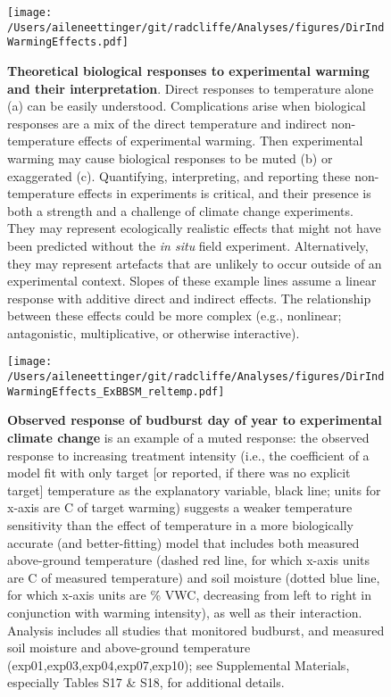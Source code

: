 \documentclass{article}
\begin{document}
 \begin{figure}[h]
\centering
 \texttt{[image: /Users/aileneettinger/git/radcliffe/Analyses/figures/DirIndWarmingEffects.pdf]} 
 \caption{\textbf{Theoretical biological responses to experimental warming and their interpretation}. Direct responses to temperature alone (a) can be easily understood. Complications arise when biological responses are a mix of the direct temperature and indirect non-temperature effects of experimental warming. Then experimental warming may cause biological responses to be muted (b) or exaggerated (c). Quantifying, interpreting, and reporting these non-temperature effects in experiments is critical, and their presence is both a strength and a challenge of climate change experiments. They may represent ecologically realistic effects that might not have been predicted without the \emph{in situ} field experiment. Alternatively, they may represent artefacts that are unlikely to occur outside of an experimental context. Slopes of these example lines assume a linear response with additive direct and indirect effects. The relationship between these effects could be more complex (e.g., nonlinear; antagonistic, multiplicative, or otherwise interactive).} 
\label{fig:biolimp}
\end{figure}

\begin{figure}[h]
\centering
 \texttt{[image: /Users/aileneettinger/git/radcliffe/Analyses/figures/DirIndWarmingEffects\_ExBBSM\_reltemp.pdf]} 
 \caption{\textbf{Observed response of budburst day of year to experimental climate change} is an example of a muted response: the observed response to increasing treatment intensity (i.e., the coefficient of a model fit with only target [or reported, if there was no explicit target] temperature as the explanatory variable, black line; units for x-axis are \degree C of target warming) suggests a weaker temperature sensitivity than the effect of temperature in a more biologically accurate (and better-fitting) model that includes both measured above-ground temperature (dashed red line, for which x-axis units are \degree C of measured temperature) and soil moisture (dotted blue line, for which x-axis units are \% VWC, decreasing from left to right in conjunction with warming intensity), as well as their interaction. Analysis includes all studies that monitored budburst, and measured soil moisture and above-ground temperature (exp01,exp03,exp04,exp07,exp10); see Supplemental Materials, especially Tables S17 \& S18, for additional details.} 
 
\label{fig:phen}
\end{figure}
 

\end{document}
